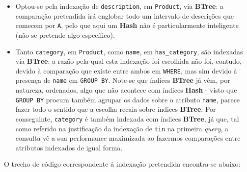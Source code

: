 \documentclass[12pt,a4paper]{article}
\begin{document}
\begin{itemize}
  \item Optou-se pela indexação de \texttt{description}, em \texttt{Product},
        via \textbf{BTree}: a comparação pretendida irá englobar todo um intervalo
        de descrições que comecem por \texttt{A}, pelo que aqui um \textbf{Hash}
        não é particularmente inteligente (não se pretende algo específico).
  \item Tanto \texttt{category}, em \texttt{Product}, como \texttt{name}, em \texttt{has\_category},
        são indexadas via \textbf{BTree}: a razão pela qual esta indexação foi escolhida
        não foi, contudo, devido à comparação que existe entre ambos em \texttt{WHERE},
        mas sim devido à presença de \texttt{name} em \texttt{GROUP BY}. Note-se que
        índices \textbf{BTree} já vêm, por natureza, ordenados, algo que não
        acontece com índices \textbf{Hash} - visto que \texttt{GROUP BY} procura
        também agrupar os dados sobre o atributo \texttt{name}, parece fazer todo
        o sentido que a escolha recaia sobre índices \textbf{BTree}. Por conseguinte,
        \texttt{category} é também indexada com índices \textbf{BTree}, já que, tal como referido na justificação
        da indexação de \texttt{tin} na primeira \textit{query}, a consulta
        vê a sua performance maximizada ao fazermos comparações entre atributos
        indexados de igual forma.
\end{itemize}

O trecho de código correspondente à indexação pretendida encontra-se abaixo:


\end{document}
